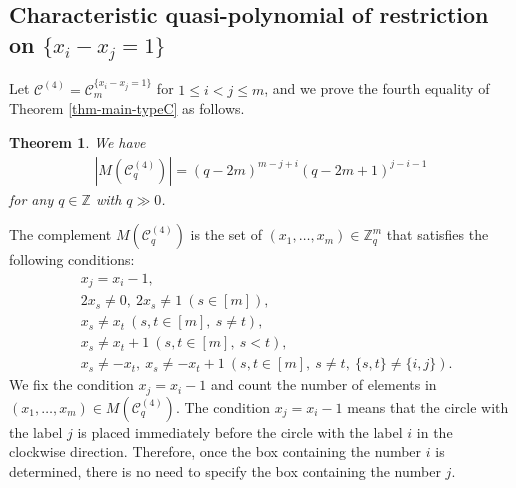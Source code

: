 \documentclass{article}
\theoremstyle{plain}
\newtheorem{Them}{Theorem}[section]
\theoremstyle{definition}
\theoremstyle{remark}
\numberwithin{equation}{section}
\newcommand{\Cc}{\mathcal{C}}
\begin{document}
\subsection{Characteristic quasi-polynomial of restriction on $\{x_i-x_j=1\}$}\label{sec-TypeC-rest-xi=xj+1}
Let $\Cc^{(4)}=\mathcal{C}_m^{\{x_i-x_j=1\}}$ for $1\leq i<j \leq m$, and we prove the fourth equality of Theorem \ref{thm-main-typeC} as follows.
\begin{Them}\label{thm-char-quasi-TypeC-xi=xj+1}
We have
\begin{align*}
\left|M(\Cc_q^{(4)})\right|=(q-2m)^{m-j+i}(q-2m+1)^{j-i-1}
\end{align*}
for any $q\in\mathbb{Z}$ with $q\gg 0$.
\end{Them}
The complement $M(\Cc^{(4)}_q)$ is the set of $(x_1,\dots,x_m)\in\mathbb{Z}_q^m$ that satisfies the following conditions:
\begin{align*}
&x_j=x_i-1,\\
&2x_s\neq 0,\ 2x_s\neq 1\ (s\in [m]),\\
&x_s\neq x_t\ (s,t\in [m],\ s\neq t),\\
&x_s\neq x_t+1\ (s,t\in [m],\ s<t),\\
&x_s\neq -x_t,\ x_s\neq -x_t+1\ (s,t\in [m],\ s\neq t,\ \{s,t\}\neq \{i,j\}).
\end{align*}
We fix the condition $x_j=x_i-1$ and count the number of elements in $(x_1,\dots,x_m)\in M(\Cc^{(4)}_q)$. %
The condition $x_j=x_i-1$ means that the circle with the label $j$ is placed immediately before the circle with the label $i$ in the clockwise direction.
Therefore, once the box containing the number $i$ is determined, there is no need to specify the box containing the number $j$.
\end{document}
